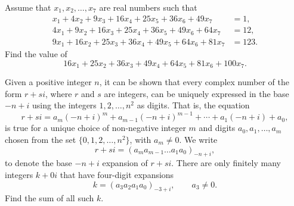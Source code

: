 \begin{question}[name={1989 AIME, \href{https://artofproblemsolving.com/community/c4p436470}{Problem 8}}]
	Assume that $x_1,x_2,\ldots,x_7$ are real numbers such that
	\begin{align*}
		x_1+4x_2+9x_3+16x_4+25x_5+36x_6+49x_7 &=1, \\ 
		4x_1+9x_2+16x_3+25x_4+36x_5+49x_6+64x_7 &=12,\\ 
		9x_1+16x_2+25x_3+36x_4+49x_5+64x_6+81x_7 &=123.
	\end{align*}  
	Find the value of\[16x_1+25x_2+36x_3+49x_4+64x_5+81x_6+100x_7.\]
\end{question}

%
%	
%




\begin{question}[name={1989 AIME, \href{https://artofproblemsolving.com/community/c4p436603}{Problem 14}}]
	Given a positive integer $n$, it can be shown that every complex number of the form $r+si$, where $r$ and $s$ are integers, can be uniquely expressed in the base $-n+i$ using the integers $1,2,\ldots,n^2$ as digits. That is, the equation\[ r+si=a_m(-n+i)^m+a_{m-1}(-n+i)^{m-1}+\cdots +a_1(-n+i)+a_0,  \]is true for a unique choice of non-negative integer $m$ and digits $a_0,a_1,\ldots,a_m$ chosen from the set $\{0,1,2,\ldots,n^2\}$, with $a_m\ne 0$. We write\[ r+si=(a_ma_{m-1}\ldots a_1a_0)_{-n+i},  \]to denote the base $-n+i$ expansion of $r+si$. There are only finitely many integers $k+0i$ that have four-digit expansions\[ k=(a_3a_2a_1a_0)_{-3+i}, \qquad a_3\ne 0.  \]Find the sum of all such $k$.
\end{question}


